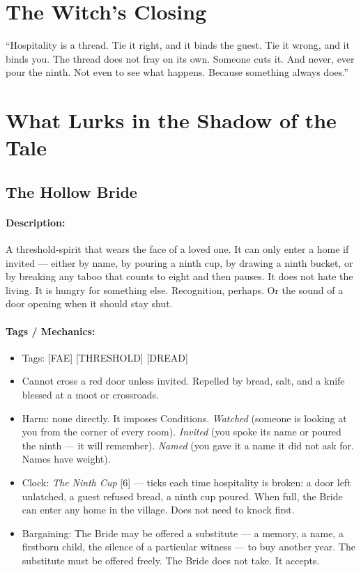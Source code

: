 \section*{The Witch's Closing}

``Hospitality is a thread. Tie it right, and it binds the guest. Tie it wrong, and it binds you. The thread does not fray on its own. Someone cuts it. And never, ever pour the ninth. Not even to see what happens. Because something always does.''

\section*{What Lurks in the Shadow of the Tale}

\subsection*{The Hollow Bride}

\paragraph{Description:}

A threshold-spirit that wears the face of a loved one. It can only enter a home if invited --- either by name, by pouring a ninth cup, by drawing a ninth bucket, or by breaking any taboo that counts to eight and then pauses. It does not hate the living. It is hungry for something else. Recognition, perhaps. Or the sound of a door opening when it should stay shut.

\paragraph{Tags / Mechanics:}

\begin{itemize}
\item Tags: [FAE] [THRESHOLD] [DREAD]
\item Cannot cross a red door unless invited. Repelled by bread, salt, and a knife blessed at a moot or crossroads.
\item Harm: none directly. It imposes Conditions. \textit{Watched} (someone is looking at you from the corner of every room). \textit{Invited} (you spoke its name or poured the ninth --- it will remember). \textit{Named} (you gave it a name it did not ask for. Names have weight).
\item Clock: \textit{The Ninth Cup} [6] --- ticks each time hospitality is broken: a door left unlatched, a guest refused bread, a ninth cup poured. When full, the Bride can enter any home in the village. Does not need to knock first.
\item Bargaining: The Bride may be offered a substitute --- a memory, a name, a firstborn child, the silence of a particular witness --- to buy another year. The substitute must be offered freely. The Bride does not take. It accepts.
\end{itemize}

